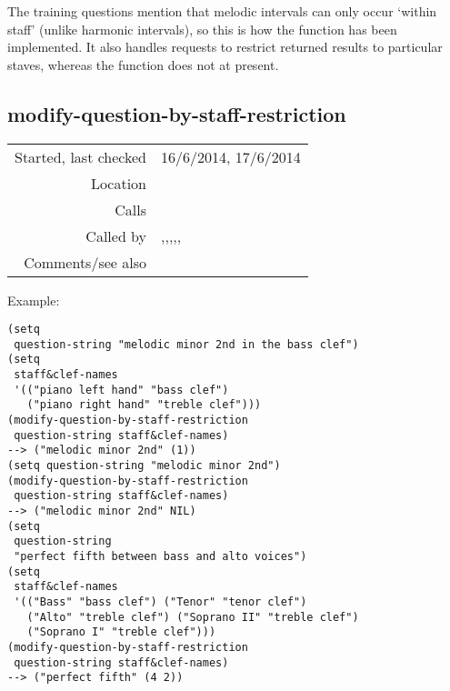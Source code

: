 The training questions mention that melodic intervals
can only occur `within staff' (unlike harmonic
intervals), so this is how the function has been
implemented. It also handles requests to restrict
returned results to particular staves, whereas
the function  does
not at present.


\subsection*{modify-question-by-staff-restriction}\label{fun:modify-question-by-staff-restriction}

\vspace{0.3cm}
\begin{tabular}{r|p{8cm}}
Started, last checked & 16/6/2014, 17/6/2014 \\
Location & \nameref{sec:pitches-intervals-durations} \\
Calls & \nameref{fun:remove-staff-restriction-from-q-string} \\
Called by & \nameref{fun:duration-n-pitch-class-time-intervals},\newline \nameref{fun:duration-time-intervals},\newline \nameref{fun:melodic-interval-of-a},\newline \nameref{fun:nadir-apex-time-intervals},\newline \nameref{fun:pitch-class-time-intervals},\newline \nameref{fun:rest-duration-time-intervals} \\
Comments/see also &
\end{tabular}

\vspace{0.5cm}
\noindent Example:
\begin{verbatim}
(setq
 question-string "melodic minor 2nd in the bass clef")
(setq
 staff&clef-names
 '(("piano left hand" "bass clef") 
   ("piano right hand" "treble clef")))
(modify-question-by-staff-restriction
 question-string staff&clef-names)
--> ("melodic minor 2nd" (1))
(setq question-string "melodic minor 2nd")
(modify-question-by-staff-restriction
 question-string staff&clef-names)
--> ("melodic minor 2nd" NIL)
(setq
 question-string
 "perfect fifth between bass and alto voices")
(setq
 staff&clef-names
 '(("Bass" "bass clef") ("Tenor" "tenor clef")
   ("Alto" "treble clef") ("Soprano II" "treble clef")
   ("Soprano I" "treble clef")))
(modify-question-by-staff-restriction
 question-string staff&clef-names)
--> ("perfect fifth" (4 2))
\end{verbatim}

